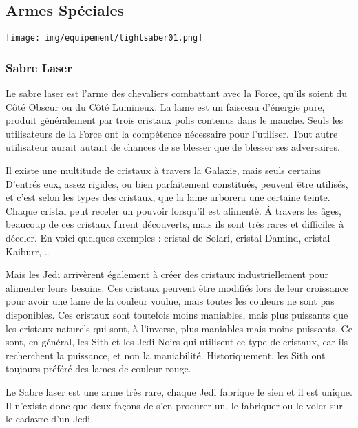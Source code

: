 
\clearpage
\subsection{Armes Spéciales}
\label{sec:sabre-laser}

\begin{flushright}
	\vspace{-3\baselineskip}
	\texttt{[image: img/equipement/lightsaber01.png]}
	\vspace{-4\baselineskip}
\end{flushright}
\subsubsection{Sabre Laser}

Le sabre laser est l’arme des chevaliers combattant avec la Force, qu’ils soient du Côté Obscur ou du Côté Lumineux. La lame est un faisceau d’énergie pure, produit généralement par trois cristaux polis contenus dans le manche. Seuls les utilisateurs de la Force ont la compétence nécessaire pour l’utiliser. Tout autre utilisateur aurait autant de chances de se blesser que de blesser ses adversaires. 

Il existe une multitude de cristaux à travers la Galaxie, mais seuls certains D’entrés eux, assez rigides, ou bien parfaitement constitués, peuvent être utilisés, et c’est selon les types des cristaux, que la lame arborera une certaine teinte. Chaque cristal peut receler un pouvoir lorsqu’il est alimenté. \'A travers les âges, beaucoup de ces cristaux furent découverts, mais ils sont très rares et difficiles à déceler. En voici quelques exemples : cristal de Solari, cristal Damind, cristal Kaiburr, \ldots

Mais les Jedi arrivèrent également à créer des cristaux industriellement pour alimenter leurs besoins. Ces cristaux peuvent être modifiés lors de leur croissance pour avoir une lame de la couleur voulue, mais toutes les couleurs ne sont pas disponibles. Ces cristaux sont toutefois moins maniables, mais plus puissants que les cristaux naturels qui sont, à l’inverse, plus maniables mais moins puissants. Ce sont, en général, les Sith et les Jedi Noirs qui utilisent ce type de cristaux, car ils recherchent la puissance, et non la maniabilité. Historiquement, les Sith ont toujours préféré des lames de couleur rouge. 

Le Sabre laser est une arme très rare, chaque Jedi fabrique le sien et il est unique. Il n’existe donc que deux façons de s’en procurer un, le fabriquer ou le voler sur le cadavre d’un Jedi.\\

